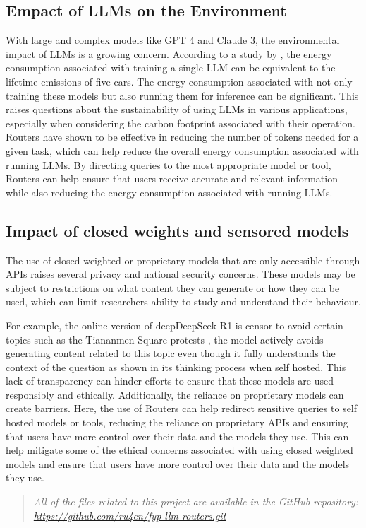 \subsection{Empact of LLMs on the Environment}
\label{sec:discussion-impact-of-llms-on-the-environment}

With large and complex models like GPT 4 and Claude 3, the environmental impact of LLMs is a growing concern. According to a study by \citep{strubell2019energypolicyconsiderationsdeep}, the energy consumption associated with training a single LLM can be equivalent to the lifetime emissions of five cars. The energy consumption associated with not only training these models but also running them for inference can be significant. This raises questions about the sustainability of using LLMs in various applications, especially when considering the carbon footprint associated with their operation. Routers have shown to be effective in reducing the number of tokens needed for a given task, which can help reduce the overall energy consumption associated with running LLMs. By directing queries to the most appropriate model or tool, Routers can help ensure that users receive accurate and relevant information while also reducing the energy consumption associated with running LLMs.

\subsection{Impact of closed weights and sensored models}
\label{sec:discussion-impact-of-closed-weights-and-sensored-models}

The use of closed weighted or proprietary models that are only accessible through APIs raises several privacy and national security concerns. These models may be subject to restrictions on what content they can generate or how they can be used, which can limit researchers ability to study and understand their behaviour. 

For example, the online version of deepDeepSeek R1 is censor to avoid certain topics such as the Tiananmen Square protests \citep{independent-deepseek}, the model actively avoids generating content related to this topic even though it fully understands the context of the question as shown in its thinking process when self hosted\citep{jeramos-deepseek}. This lack of transparency can hinder efforts to ensure that these models are used responsibly and ethically. Additionally, the reliance on proprietary models can create barriers. Here, the use of Routers can help redirect sensitive queries to self hosted models or tools, reducing the reliance on proprietary APIs and ensuring that users have more control over their data and the models they use. This can help mitigate some of the ethical concerns associated with using closed weighted models and ensure that users have more control over their data and the models they use.


\begin{quote}
    \textit{All of the files related to this project are available in the GitHub repository: \newline \url{https://github.com/ru4en/fyp-llm-routers.git}}
\end{quote}
